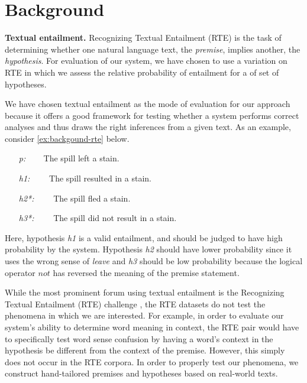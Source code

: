 \section{Background}

\textbf{Textual entailment.}
Recognizing Textual Entailment (RTE) is the task of determining whether one
natural language text, the {\it premise}, implies another, the {\it hypothesis}.
For evaluation of our system, we have chosen to use a variation on RTE in which
we assess the relative probability of entailment for a of set of hypotheses.

We have chosen textual entailment as the mode of evaluation
for our approach because it offers a good framework for testing whether a system
performs correct analyses and thus draws the right inferences from a given text.
As an example, consider \eqref{ex:backgound-rte} below.    
\begin{covex}\label{ex:backgound-rte}
\begin{itemize} \itemsep -3pt
  \item[{\it p:}]~~~    The spill left a stain.
  \item[{\it h1:}]~~~~The spill resulted in a stain.
  \item[{\it h2*:}]~~~~The spill fled a stain.
  \item[{\it h3*:}]~~~~The spill did not result in a stain.
\end{itemize}
\end{covex}
Here, hypothesis {\it h1} is a valid entailment, and should be judged to have
high probability by the system.  Hypothesis {\it h2} should have lower probability since
it uses the wrong sense of {\it leave} and {\it h3} should be low probability
because the logical operator $not$ has reversed the meaning of the premise
statement.

While the most prominent forum using textual entailment is the Recognizing
Textual Entailment (RTE) challenge \citep{dagan:rte2005}, the RTE datasets do
not test the phenomena in which we are interested. For example, in order to
evaluate our system's ability to determine word meaning in context, the RTE pair
would have to specifically test word sense confusion by having a word's context
in the hypothesis be different from the context of the premise.  However, this
simply does not occur in the RTE corpora.  In order to properly test our
phenomena, we construct hand-tailored premises and hypotheses based on
real-world texts.


